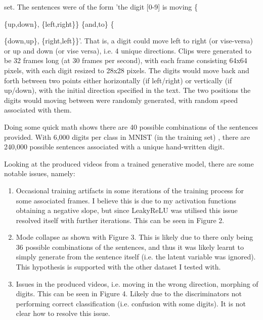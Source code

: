 \documentclass{article}
\begin{document}
set. The sentences were of the form 'the digit [0-9] is moving \{{\{up,down\},
\{left,right\}\} \{and,to\} \{{\{down,up\}, \{right,left\}\}'. That is, a digit
could move left to right (or vise-versa) or up and down (or vise versa), i.e. 4
unique directions. Clips were generated to be 32 frames long (at 30 frames per
second), with each frame consisting 64x64 pixels, with each digit
resized to 28x28 pixels. The digits would move back and forth between
two points either horizontally (if left/right) or vertically (if
up/down), with the initial direction specified in the text. The two
positions the digits would moving between were randomly generated, with
random speed associated with them.

Doing some quick math shows there are 40 possible combinations of the sentences
provided. With 6,000 digits per class in MNIST (in the training set)
\cite{yann_mnist_nodate}, there are 240,000 possible sentences associated with a
unique hand-written digit. 

Looking at the produced videos from a trained generative model, there are some notable issues, namely:

\begin{enumerate}
    \item Occasional training artifacts in some iterations of the training
        process for some associated frames. I believe this is due to my
        activation functions obtaining a negative slope, but since LeakyReLU
        \cite{xu_empirical_2015} was utilised this issue resolved itself with further
        iterations. This can be seen in Figure 2.
    \item Mode collapse as shown with Figure 3. This is likely due to there
        only being 36 possible combinations of the sentences, and thus it was
        likely learnt to simply generate from the sentence itself (i.e. the
        latent variable was ignored). This hypothesis is supported with the other dataset I tested with.
    \item Issues in the produced videos, i.e. moving in the wrong direction, morphing of digits. This can be seen in Figure 4. Likely due to the discriminators not performing correct classification (i.e. confusion with some digits). It is not clear how to resolve this issue.
\end{enumerate}

}}
\end{document}
